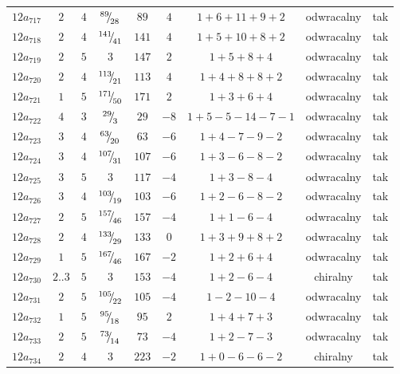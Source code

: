 \begin{longtable}{ccccccccc}
$12a_{717}$ & $2$ & $4$ & ${}^{89}{\mskip -5mu/\mskip -3mu}_{28}$ & $89$ & $4$ & $1+6+11+9+2$ & odwracalny & tak \\
$12a_{718}$ & $2$ & $4$ & ${}^{141}{\mskip -5mu/\mskip -3mu}_{41}$ & $141$ & $4$ & $1+5+10+8+2$ & odwracalny & tak \\
$12a_{719}$ & $2$ & $5$ & $3$ & $147$ & $2$ & $1+5+8+4$ & odwracalny & tak \\
$12a_{720}$ & $2$ & $4$ & ${}^{113}{\mskip -5mu/\mskip -3mu}_{21}$ & $113$ & $4$ & $1+4+8+8+2$ & odwracalny & tak \\
$12a_{721}$ & $1$ & $5$ & ${}^{171}{\mskip -5mu/\mskip -3mu}_{50}$ & $171$ & $2$ & $1+3+6+4$ & odwracalny & tak \\
$12a_{722}$ & $4$ & $3$ & ${}^{29}{\mskip -5mu/\mskip -3mu}_{3}$ & $29$ & $-8$ & $1+5-5-14-7-1$ & odwracalny & tak \\
$12a_{723}$ & $3$ & $4$ & ${}^{63}{\mskip -5mu/\mskip -3mu}_{20}$ & $63$ & $-6$ & $1+4-7-9-2$ & odwracalny & tak \\
$12a_{724}$ & $3$ & $4$ & ${}^{107}{\mskip -5mu/\mskip -3mu}_{31}$ & $107$ & $-6$ & $1+3-6-8-2$ & odwracalny & tak \\
$12a_{725}$ & $3$ & $5$ & $3$ & $117$ & $-4$ & $1+3-8-4$ & odwracalny & tak \\
$12a_{726}$ & $3$ & $4$ & ${}^{103}{\mskip -5mu/\mskip -3mu}_{19}$ & $103$ & $-6$ & $1+2-6-8-2$ & odwracalny & tak \\
$12a_{727}$ & $2$ & $5$ & ${}^{157}{\mskip -5mu/\mskip -3mu}_{46}$ & $157$ & $-4$ & $1+1-6-4$ & odwracalny & tak \\
$12a_{728}$ & $2$ & $4$ & ${}^{133}{\mskip -5mu/\mskip -3mu}_{29}$ & $133$ & $0$ & $1+3+9+8+2$ & odwracalny & tak \\
$12a_{729}$ & $1$ & $5$ & ${}^{167}{\mskip -5mu/\mskip -3mu}_{46}$ & $167$ & $-2$ & $1+2+6+4$ & odwracalny & tak \\
$12a_{730}$ & $2..3$ & $5$ & $3$ & $153$ & $-4$ & $1+2-6-4$ & chiralny & tak \\
$12a_{731}$ & $2$ & $5$ & ${}^{105}{\mskip -5mu/\mskip -3mu}_{22}$ & $105$ & $-4$ & $1-2-10-4$ & odwracalny & tak \\
$12a_{732}$ & $1$ & $5$ & ${}^{95}{\mskip -5mu/\mskip -3mu}_{18}$ & $95$ & $2$ & $1+4+7+3$ & odwracalny & tak \\
$12a_{733}$ & $2$ & $5$ & ${}^{73}{\mskip -5mu/\mskip -3mu}_{14}$ & $73$ & $-4$ & $1+2-7-3$ & odwracalny & tak \\
$12a_{734}$ & $2$ & $4$ & $3$ & $223$ & $-2$ & $1+0-6-6-2$ & chiralny & tak \\

\end{longtable}
